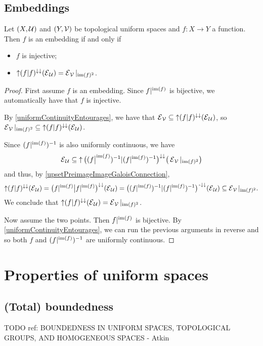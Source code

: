 \subsection{Embeddings}
\begin{proposition} \label{embeddingTopologicalUniformity}
Let $\sSet{X,\mathcal{U}}$ and $\sSet{Y,\mathcal{V}}$ be topological uniform spaces and $f: X\to Y$ a function. Then $f$ is an embedding \textup{if and only if}
\begin{itemize}
\item $f$ is injective;
\item $\operatorname{\uparrow}(f|f)^{\downarrow\downarrow}(\operatorname{\mathcal{E}}_\mathcal{U}) = \operatorname{\mathcal{E}}_\mathcal{V}|_{\operatorname{im}(f)^2}$.
\end{itemize}
\end{proposition}
\begin{proof}
First assume $f$ is an embedding. Since $f|^{\operatorname{im}(f)}$ is bijective, we automatically have that $f$ is injective.

By \ref{uniformContinuityEntourages}, we have that $\operatorname{\mathcal{E}}_{\mathcal{V}}\subseteq \operatorname{\uparrow}(f|f)^{\downarrow\downarrow}(\operatorname{\mathcal{E}}_\mathcal{U})$, so $\operatorname{\mathcal{E}}_{\mathcal{V}}|_{\operatorname{im}(f)^2} \subseteq \operatorname{\uparrow}(f|f)^{\downarrow\downarrow}(\operatorname{\mathcal{E}}_\mathcal{U})$.

Since $(f|^{\operatorname{im}(f)})^{-1}$ is also uniformly continuous, we have
\[ \operatorname{\mathcal{E}}_\mathcal{U} \subseteq \operatorname{\uparrow} \big((f\big|^{\operatorname{im}(f)})^{-1}|(f|^{\operatorname{im}(f)})^{-1}\big)^{\downarrow\downarrow}\big(\operatorname{\mathcal{E}}_{\mathcal{V}}|_{\operatorname{im}(f)^2}\big) \]
and thus, by \ref{upsetPreimageImageGaloisConnection},
\[ \operatorname{\uparrow}(f|f)^{\downarrow\downarrow}(\operatorname{\mathcal{E}}_\mathcal{U}) = \big(f|^{\operatorname{im}(f)}\big|f|^{\operatorname{im}(f)}\big)^{\downarrow\downarrow}(\operatorname{\mathcal{E}}_{\mathcal{U}}) = \big((f|^{\operatorname{im}(f)})^{-1}|(f|^{\operatorname{im}(f)})^{-1}\big)^{{\text{\hspace{0.15em}-}\downarrow}\downarrow}(\operatorname{\mathcal{E}}_{\mathcal{U}}) \subseteq \operatorname{\mathcal{E}}_{\mathcal{V}}|_{\operatorname{im}(f)^2}. \]
We conclude that $\operatorname{\uparrow}(f|f)^{\downarrow\downarrow}(\operatorname{\mathcal{E}}_\mathcal{U}) = \operatorname{\mathcal{E}}_\mathcal{V}|_{\operatorname{im}(f)^2}$.

Now assume the two points. Then $f|^{\operatorname{im}(f)}$ is bijective. 
By \ref{uniformContinuityEntourages}, we can run the previous arguments in reverse and so both $f$ and $(f|^{\operatorname{im}(f)})^{-1}$ are uniformly continuous.
\end{proof}

\section{Properties of uniform spaces}
\subsection{(Total) boundedness}
TODO ref: BOUNDEDNESS IN UNIFORM SPACES, TOPOLOGICAL GROUPS, AND HOMOGENEOUS SPACES - Atkin

